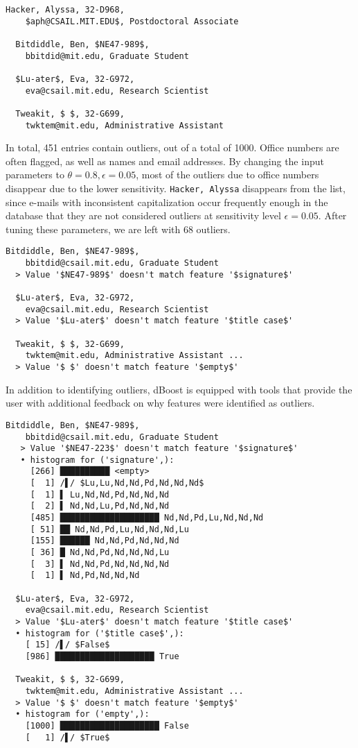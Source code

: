 \begin{lstlisting}[gobble=2]
  Hacker, Alyssa, 32-D968,
    $aph@CSAIL.MIT.EDU$, Postdoctoral Associate

  Bitdiddle, Ben, $NE47-989$,
    bbitdid@mit.edu, Graduate Student

  $Lu-ater$, Eva, 32-G972,
    eva@csail.mit.edu, Research Scientist

  Tweakit, $ $, 32-G699,
    twktem@mit.edu, Administrative Assistant
\end{lstlisting}

In total, 451 entries contain outliers, out of a total of 1000. Office numbers are often flagged, as well as names and email addresses. By changing the input parameters to $\theta = 0.8, \epsilon = 0.05$, most of the outliers due to office numbers disappear due to the lower sensitivity. \lstinline{Hacker, Alyssa} disappears from the list, since e-mails with inconsistent capitalization occur frequently enough in the database that they are not considered outliers at sensitivity level $\epsilon = 0.05$. After tuning these parameters, we are left with 68 outliers.

\begin{lstlisting}[gobble=2]
  Bitdiddle, Ben, $NE47-989$,
    bbitdid@csail.mit.edu, Graduate Student
  > Value '$NE47-989$' doesn't match feature '$signature$'

  $Lu-ater$, Eva, 32-G972,
    eva@csail.mit.edu, Research Scientist
  > Value '$Lu-ater$' doesn't match feature '$title case$'

  Tweakit, $ $, 32-G699,
    twktem@mit.edu, Administrative Assistant ...
  > Value '$ $' doesn't match feature '$empty$'
\end{lstlisting}

In addition to identifying outliers, dBoost is equipped with tools that provide the user with additional feedback on why features were identified as outliers.

\begin{lstlisting}[gobble=2]
  Bitdiddle, Ben, $NE47-989$,
    bbitdid@csail.mit.edu, Graduate Student
   > Value '$NE47-223$' doesn't match feature '$signature$'
   • histogram for ('signature',):
     [266] ██████████ <empty>
     [  1] /▌/ $Lu,Lu,Nd,Nd,Pd,Nd,Nd,Nd$
     [  1] ▌ Lu,Nd,Nd,Pd,Nd,Nd,Nd
     [  2] ▌ Nd,Nd,Lu,Pd,Nd,Nd,Nd
     [485] ████████████████████ Nd,Nd,Pd,Lu,Nd,Nd,Nd
     [ 51] ██ Nd,Nd,Pd,Lu,Nd,Nd,Nd,Lu
     [155] ██████ Nd,Nd,Pd,Nd,Nd,Nd
     [ 36] █ Nd,Nd,Pd,Nd,Nd,Nd,Lu
     [  3] ▌ Nd,Nd,Pd,Nd,Nd,Nd,Nd
     [  1] ▌ Nd,Pd,Nd,Nd,Nd

  $Lu-ater$, Eva, 32-G972,
    eva@csail.mit.edu, Research Scientist
  > Value '$Lu-ater$' doesn't match feature '$title case$'
  • histogram for ('$title case$',):
    [ 15] /▌/ $False$
    [986] ████████████████████ True

  Tweakit, $ $, 32-G699,
    twktem@mit.edu, Administrative Assistant ...
  > Value '$ $' doesn't match feature '$empty$'
  • histogram for ('empty',):
    [1000] ████████████████████ False
    [   1] /▌/ $True$
\end{lstlisting}

